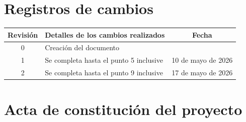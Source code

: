 \documentclass[
11pt, %
]{charter}
\begin{document}
\maketitle
\thispagestyle{empty}
\pagebreak


\thispagestyle{empty}
{\setlength{\parskip}{0pt}
\tableofcontents{}
}
\pagebreak


\section*{Registros de cambios}
\label{sec:registro}


\begin{table}[ht]
\label{tab:registro}
\centering
\begin{tabularx}{\linewidth}{@{}|c|X|c|@{}}
\hline
\rowcolor[HTML]{C0C0C0} 
Revisión & \multicolumn{1}{c|}{\cellcolor[HTML]{C0C0C0}Detalles de los cambios realizados} & Fecha      \\ \hline
0      & Creación del documento                                 &\fechaInicioName 		\\ \hline
1      & Se completa hasta el punto 5 inclusive                	& {10} de {mayo} de 2026 \\ \hline
2      & Se completa hasta el punto 9 inclusive					& {17} de {mayo} de 2026 \\ \hline


\end{tabularx}
\end{table}

\pagebreak



\section*{Acta de constitución del proyecto}
\label{sec:acta}
\end{document}
